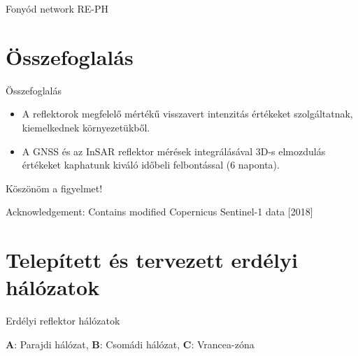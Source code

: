 \documentclass[aspectratio=169]{beamer}
\begin{document}
\begin{frame}{Fonyód network RE-PH}
\end{frame}

\section{Összefoglalás}

\begin{frame}{Összefoglalás}
    \begin{itemize}
        \item A reflektorok megfelelő mértékű visszavert intenzitás értékeket szolgáltatnak, kiemelkednek környezetükből.
        \item A GNSS és az InSAR reflektor mérések integrálásával 3D-s elmozdulás értékeket kaphatunk kiváló időbeli felbontással (6 naponta).
    \end{itemize}
\end{frame}

\begin{frame}
    \begin{center}
        \Huge \color{blue!55!black}
        Köszönöm a figyelmet!
    \end{center}
    \vspace{35pt}
    {\large
    Acknowledgement: Contains modified Copernicus Sentinel-1 data [2018]
    }
\end{frame}


\backupbegin

\section*{Telepített és tervezett erdélyi hálózatok}

\begin{frame}{Erdélyi reflektor hálózatok}
    \centering
    \begin{minipage}[c]{0.65\textwidth}
        \erdely
        \begin{center}
            \textbf{A}: Parajdi hálózat, 
            \textbf{B}: Csomádi hálózat, 
            \textbf{C}: Vrancea-zóna
        \end{center}
    \end{minipage}
\end{frame}
\end{document}
